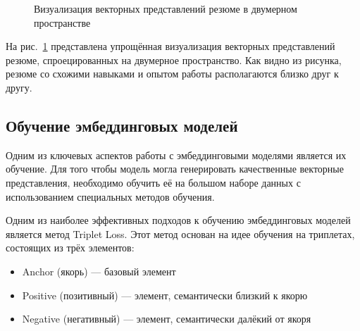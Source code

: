 \documentclass[14pt]{mmcs_article}
\begin{document}
\begin{figure}[h]
  \centering
  \caption{\centering Визуализация векторных представлений резюме в двумерном пространстве}
  \label{fig:embedding_visualization}
\end{figure}

На рис.~\ref{fig:embedding_visualization} представлена упрощённая визуализация векторных представлений резюме, спроецированных на двумерное пространство. Как видно из рисунка, резюме со схожими навыками и опытом работы располагаются близко друг к другу.

\subsection{Обучение эмбеддинговых моделей}

Одним из ключевых аспектов работы с эмбеддинговыми моделями является их обучение. Для того чтобы модель могла генерировать качественные векторные представления, необходимо обучить её на большом наборе данных с использованием специальных методов обучения.

Одним из наиболее эффективных подходов к обучению эмбеддинговых моделей является метод Triplet Loss. Этот метод основан на идее обучения на триплетах, состоящих из трёх элементов:
\begin{itemize}
  \item Anchor (якорь) --- базовый элемент
  \item Positive (позитивный) --- элемент, семантически близкий к якорю
  \item Negative (негативный) --- элемент, семантически далёкий от якоря
\end{itemize}
\end{document}

